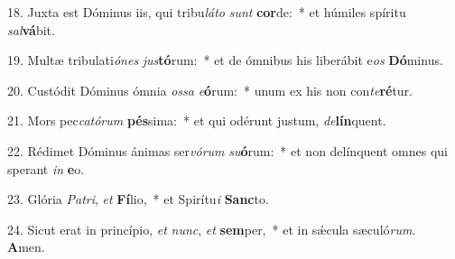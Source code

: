 18. Juxta est Dóminus iis, qui tribu\textit{lá}\textit{to} \textit{sunt} \textbf{cor}de:~*  et húmiles spíritu \textit{sal}\textbf{vá}bit.\

19. Multæ tribulati\textit{ó}\textit{nes} \textit{jus}\textbf{tó}rum:~*  et de ómnibus his liberábit e\textit{os} \textbf{Dó}minus.\

20. Custódit Dóminus ómnia \textit{os}\textit{sa} \textit{e}\textbf{ó}rum:~*  unum ex his non con\textit{te}\textbf{ré}tur.\

21. Mors pec\textit{ca}\textit{tó}\textit{rum} \textbf{pés}sima:~*  et qui odérunt justum, \textit{de}\textbf{lín}quent.\

22. Rédimet Dóminus ánimas ser\textit{vó}\textit{rum} \textit{su}\textbf{ó}rum:~*  et non delínquent omnes qui sperant \textit{in} \textbf{e}o.\

23. Glória \textit{Pa}\textit{tri}, \textit{et} \textbf{Fí}lio,~*  et Spirítu\textit{i} \textbf{Sanc}to.\

24. Sicut erat in princípio, \textit{et} \textit{nunc}, \textit{et} \textbf{sem}per,~*  et in sǽcula sæculó\textit{rum}. \textbf{A}men.\

